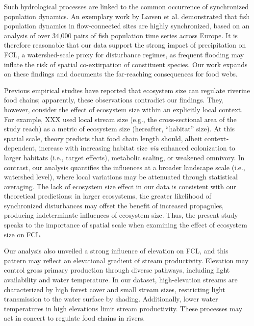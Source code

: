 \documentclass[11pt, class=article, crop=false]{standalone}
\begin{document}
Such hydrological processes are linked to the common occurrence of synchronized population dynamics.
An exemplary work by Larsen et al. demonstrated that fish population dynamics in flow-connected sites are highly synchronized, based on an analysis of over 34,000 pairs of fish population time series across Europe.
It is therefore reasonable that our data support the strong impact of precipitation on FCL, a watershed-scale proxy for disturbance regimes, as frequent flooding may inflate the risk of spatial co-extirpation of constituent species.
Our work expands on these findings and documents the far-reaching consequences for food webs.

Previous empirical studies have reported that ecosystem size can regulate riverine food chains;  apparently, these observations contradict our findings.
They, however, consider the effect of ecosystem size within an explicitly local context.
For example, XXX used local stream size (e.g., the cross-sectional area of the study reach) as a metric of ecosystem size (hereafter, ``habitat'' size).
At this spatial scale, theory predicts that food chain length should, albeit context-dependent, increase with increasing habitat size \textit{via} enhanced colonization to larger habitats (i.e., target effects), metabolic scaling, or weakened omnivory.
In contrast, our analysis quantifies the influences at a broader landscape scale (i.e., watershed level), where local variations may be attenuated through statistical averaging. 
The lack of ecosystem size effect in our data is consistent with our theoretical predictions: in larger ecosystems, the greater likelihood of synchronized disturbances may offset the benefit of increased propagules, producing indeterminate influences of ecosystem size.
Thus, the present study speaks to the importance of spatial scale when examining the effect of ecosystem size on FCL.

Our analysis also unveiled a strong influence of elevation on FCL, and this pattern may reflect an elevational gradient of stream productivity.
Elevation may control gross primary production through diverse pathways, including light availability and water temperature.
In our dataset, high-elevation streams are characterized by high forest cover and small stream sizes, restricting light transmission to the water surface by shading.
Additionally, lower water temperatures in high elevations limit stream productivity.
These processes may act in concert to regulate food chains in rivers.
\end{document}
